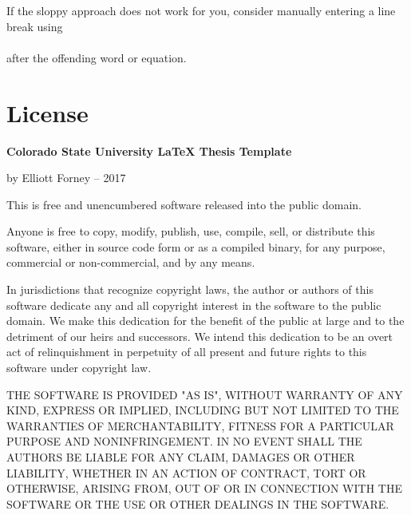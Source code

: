 \documentclass[master]{thesis}
\begin{document}
If the sloppy approach does not work for you, consider manually entering a line break using \\\\ after the offending word or equation.

\backmatter %




\appendix %

\chapter{License}
\label{appendix:license}
{ 
    \setlength{\parindent}{0em}
    \setlength{\parskip}{1em}

    \textbf{Colorado State University LaTeX Thesis Template}

    by Elliott Forney -- 2017

    This is free and unencumbered software released into the public domain.

    Anyone is free to copy, modify, publish, use, compile, sell, or distribute this software, either in source code form or as a compiled binary, for any purpose, commercial or non-commercial, and by any means.

    In jurisdictions that recognize copyright laws, the author or authors of this software dedicate any and all copyright interest in the software to the public domain. We make this dedication for the benefit of the public at large and to the detriment of our heirs and successors. We intend this dedication to be an overt act of relinquishment in perpetuity of all present and future rights to this software under copyright law.

    THE SOFTWARE IS PROVIDED "AS IS", WITHOUT WARRANTY OF ANY KIND, EXPRESS OR IMPLIED, INCLUDING BUT NOT LIMITED TO THE WARRANTIES OF MERCHANTABILITY, FITNESS FOR A PARTICULAR PURPOSE AND NONINFRINGEMENT.  IN NO EVENT SHALL THE AUTHORS BE LIABLE FOR ANY CLAIM, DAMAGES OR OTHER LIABILITY, WHETHER IN AN ACTION OF CONTRACT, TORT OR OTHERWISE, ARISING FROM, OUT OF OR IN CONNECTION WITH THE SOFTWARE OR THE USE OR OTHER DEALINGS IN THE SOFTWARE.
}

\end{document}
